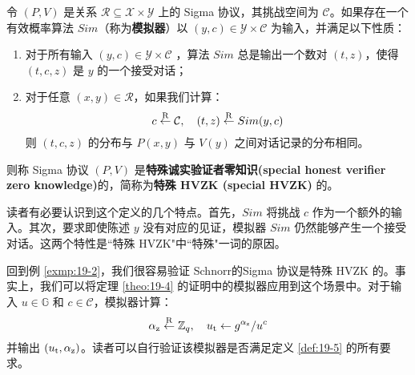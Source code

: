 \begin{definition}[特殊诚实验证者零知识]
\label{def:19-5}
令 $(P,V)$ 是关系 $\mathcal{R}\subseteq\mathcal{X}×\mathcal{Y}$ 上的 Sigma 协议，其挑战空间为 $\mathcal{C}$。如果存在一个有效概率算法 ${Sim}$（称为\textbf{模拟器}）以 $(y,c)\in\mathcal{Y}\times\mathcal{C}$ 为输入，并满足以下性质：
\begin{enumerate}
	\item 对于所有输入 $(y,c)\in\mathcal{Y}\times\mathcal{C}$ ，算法 ${Sim}$ 总是输出一个数对 $(t,z)$，使得 $(t,c,z)$ 是 $y$ 的一个接受对话；
	\item 对于任意 $(x,y)\in\mathcal{R}$，如果我们计算：
	\[
    c\overset{\rm R}\leftarrow\mathcal{C},
    \quad
    (t,z)\overset{\rm R}\leftarrow {Sim}(y,c)
    \]
    则 $(t,c,z)$ 的分布与 $P(x,y)$ 与 $V(y)$ 之间对话记录的分布相同。
\end{enumerate}
则称 Sigma 协议 $(P,V)$ 是\textbf{特殊诚实验证者零知识(special honest verifier zero knowledge)}的，简称为\textbf{特殊 HVZK (special HVZK)} 的。
\end{definition}

读者有必要认识到这个定义的几个特点。首先，${Sim}$ 将挑战 $c$ 作为一个额外的输入。其次，要求即使陈述 $y$ 没有对应的见证，模拟器 ${Sim}$ 仍然能够产生一个接受对话。这两个特性是``特殊 HVZK"中``特殊"一词的原因。

\begin{example}
回到例 \ref{exmp:19-2}，我们很容易验证 Schnorr的Sigma 协议是特殊 HVZK 的。事实上，我们可以将定理 \ref{theo:19-4} 的证明中的模拟器应用到这个场景中。对于输入 $u\in\mathbb{G}$ 和 $c\in\mathcal{C}$，模拟器计算：
\[
\alpha_{\rm z}\overset{\rm R}\leftarrow\mathbb{Z}_q,
\quad
u_{\rm t}\leftarrow{g^{\alpha_{\rm z}}}/{u^c}
\]
并输出 $(u_{\rm t},\alpha_{\rm z})$。读者可以自行验证该模拟器是否满足定义 \ref{def:19-5} 的所有要求。
\end{example}

